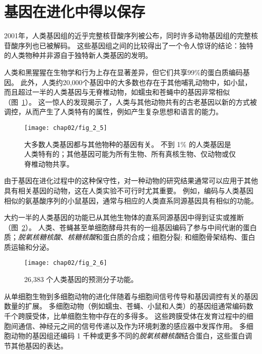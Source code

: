 \section{基因在进化中得以保存}

2001年，人类基因组的近乎完整核苷酸序列被公布，同时许多动物基因组的完整核苷酸序列也已被解码。
这些基因组之间的比较得出了一个令人惊讶的结论：独特的人类物种并非源自于独特新人类基因的发明。



人类和黑猩猩在生物学和行为上存在显著差异，但它们共享99\%的蛋白质编码基因。
此外，人类约20,000个基因中的大多数也存在于其他哺乳动物中，如小鼠，而且超过一半的人类基因与无脊椎动物，如蠕虫和苍蝇中的基因非常相似（图~\ref{fig:2_5}）。
这一惊人的发现揭示了，人类与其他动物共有的古老基因以新的方式被调控，从而产生了人类特有的属性，例如产生复杂思想和语言的能力。


\begin{figure}[htbp]
	\centering
	\texttt{[image: chap02/fig\_2\_5]}
	\caption{大多数人类基因都与其他物种的基因有关。
		不到 1\% 的人类基因是人类特有的；其他基因可能为所有生物、所有真核生物、仅动物或仅脊椎动物共享\cite{international2001initial}。}
	\label{fig:2_5}
\end{figure}


由于基因在进化过程中的这种保守性，对一种动物的研究结果通常可以应用于其他具有相关基因的动物，这在人类实验不可行时尤其重要。
例如，编码与人类基因相似的氨基酸序列的小鼠基因，通常与相应的人类直系同源基因具有相似的功能。




大约一半的人类基因的功能已从其他生物体的直系同源基因中得到证实或推断（图~\ref{fig:2_6}）。
人类、苍蝇甚至单细胞酵母共有的一组基因编码了参与中间代谢的蛋白质；\textit{脱氧核糖核酸}、\textit{核糖核酸}和蛋白质的合成；细胞分裂; 和细胞骨架结构、蛋白质运输和分泌。


\begin{figure}[htbp]
	\centering
	\texttt{[image: chap02/fig\_2\_6]}
	\caption{26,383 个人类基因的预测分子功能\cite{venter2001sequence}。}
	\label{fig:2_6}
\end{figure}


从单细胞生物到多细胞动物的进化伴随着与细胞间信号传导和基因调控有关的基因数量的扩展。
多细胞动物（例如蠕虫、苍蝇、小鼠和人类）的基因组通常编码数千个跨膜受体，比单细胞生物中存在的多得多。 
这些跨膜受体在发育过程中的细胞间通信、神经元之间的信号传递以及作为环境刺激的感应器中发挥作用。
多细胞动物的基因组还编码 1 千种或更多不同的\textit{脱氧核糖核酸}结合蛋白，这些蛋白调节其他基因的表达。




